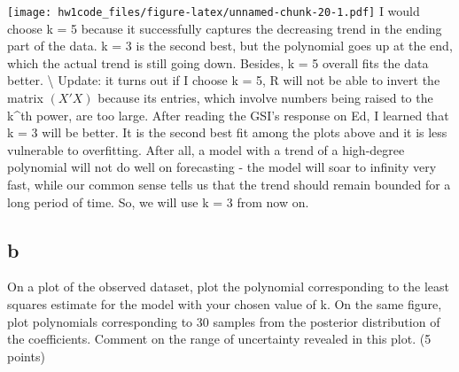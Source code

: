 \documentclass[
]{article}
\newenvironment{Shaded}{\begin{snugshade}}{\end{snugshade}}
\newcommand{\AttributeTok}[1]{\textcolor[rgb]{0.77,0.63,0.00}{#1}}
\newcommand{\DecValTok}[1]{\textcolor[rgb]{0.00,0.00,0.81}{#1}}
\newcommand{\FunctionTok}[1]{\textcolor[rgb]{0.00,0.00,0.00}{#1}}
\newcommand{\NormalTok}[1]{#1}
\newcommand{\OtherTok}[1]{\textcolor[rgb]{0.56,0.35,0.01}{#1}}
\newcommand{\SpecialCharTok}[1]{\textcolor[rgb]{0.00,0.00,0.00}{#1}}
\newcommand{\StringTok}[1]{\textcolor[rgb]{0.31,0.60,0.02}{#1}}
\begin{document}
\begin{Shaded}
\end{Shaded}

\texttt{[image: hw1code\_files/figure-latex/unnamed-chunk-20-1.pdf]} I
would choose k = 5 because it successfully captures the decreasing trend
in the ending part of the data. k = 3 is the second best, but the
polynomial goes up at the end, which the actual trend is still going
down. Besides, k = 5 overall fits the data better. \textbackslash{}
Update: it turns out if I choose k = 5, R will not be able to invert the
matrix \((X'X)\) because its entries, which involve numbers being raised
to the k\^{}th power, are too large. After reading the GSI's response on
Ed, I learned that k = 3 will be better. It is the second best fit among
the plots above and it is less vulnerable to overfitting. After all, a
model with a trend of a high-degree polynomial will not do well on
forecasting - the model will soar to infinity very fast, while our
common sense tells us that the trend should remain bounded for a long
period of time. So, we will use k = 3 from now on.

\hypertarget{b}{%
\subsection{b}\label{b}}

On a plot of the observed dataset, plot the polynomial corresponding to
the least squares estimate for the model with your chosen value of k. On
the same figure, plot polynomials corresponding to 30 samples from the
posterior distribution of the coefficients. Comment on the range of
uncertainty revealed in this plot. (5 points)
\end{document}
